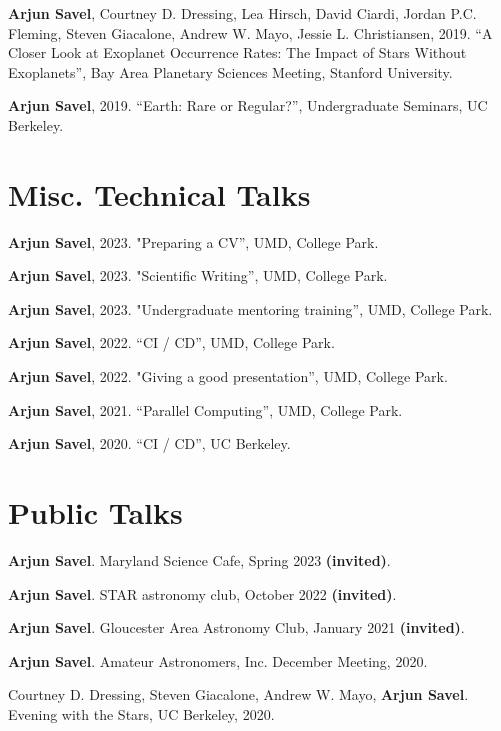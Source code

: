 \documentclass[letterpaper,10.5pt]{article}
\newcommand{\shorterSection}[1]{\vspace{-10pt}\section{#1}}
\begin{document}
\begin{list}{}{\cvlist}
\item[{\color{numcolor}\scriptsize2}] \textbf{Arjun Savel}, Courtney D. Dressing, Lea Hirsch, David Ciardi, Jordan P.C. Fleming, Steven Giacalone, Andrew W. Mayo, Jessie L. Christiansen, 2019. “A Closer Look at Exoplanet Occurrence Rates: The Impact of Stars Without Exoplanets”, Bay Area Planetary Sciences Meeting, Stanford University.

\item[{\color{numcolor}\scriptsize1}] \textbf{Arjun Savel}, 2019. “Earth: Rare or Regular?”, Undergraduate Seminars, UC Berkeley.

\end{list}

\shorterSection{Misc. Technical Talks}

\small
  \begin{list}{}{\cvlist}
\item[{\color{numcolor}\scriptsize7}] 
\textbf{Arjun Savel}, 2023. "Preparing a CV”, UMD, College Park.\item[{\color{numcolor}\scriptsize6}]
\textbf{Arjun Savel}, 2023. "Scientific Writing”, UMD, College Park.\item[{\color{numcolor}\scriptsize5}] \textbf{Arjun Savel}, 2023. "Undergraduate mentoring training”, UMD, College Park.
  \item[{\color{numcolor}\scriptsize4}] \textbf{Arjun Savel}, 2022. “CI / CD”, UMD, College Park.
  \item[{\color{numcolor}\scriptsize3}] \textbf{Arjun Savel}, 2022. "Giving a good presentation”, UMD, College Park.
  \item[{\color{numcolor}\scriptsize2}] \textbf{Arjun Savel}, 2021. “Parallel Computing”, UMD, College Park.
  \item[{\color{numcolor}\scriptsize1}] \textbf{Arjun Savel}, 2020. “CI / CD”, UC Berkeley.
  \end{list}

\shorterSection{Public Talks}
\begin{list}{}{\cvlist}
\item[{\color{numcolor}\scriptsize5}] \textbf{Arjun Savel}. Maryland Science Cafe, Spring 2023 \textbf{(invited)}.
\item[{\color{numcolor}\scriptsize4}] \textbf{Arjun Savel}. STAR astronomy club, October 2022 \textbf{(invited)}.
\item[{\color{numcolor}\scriptsize3}] \textbf{Arjun Savel}. Gloucester Area Astronomy Club, January 2021 \textbf{(invited)}.
\item[{\color{numcolor}\scriptsize2}] \textbf{Arjun Savel}. Amateur Astronomers, Inc. December Meeting, 2020.
\item[{\color{numcolor}\scriptsize1}] Courtney D. Dressing, Steven Giacalone, Andrew W. Mayo, \textbf{Arjun Savel}. Evening with the Stars, UC Berkeley, 2020.
\end{list}
\end{document}
